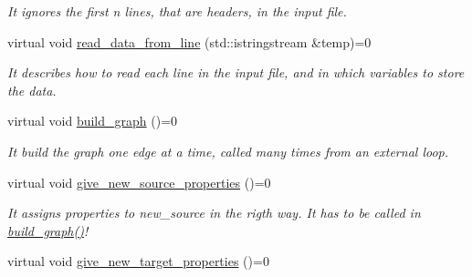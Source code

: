 \begin{DoxyCompactItemize}
\begin{DoxyCompactList}\small\item\em It ignores the first n lines, that are headers, in the input file. \item\end{DoxyCompactList}\item 
\hypertarget{classreader__base__class_a87b9c0f6d6100bab6c8d8ccf0c3a1e7e}{
virtual void \hyperlink{classreader__base__class_a87b9c0f6d6100bab6c8d8ccf0c3a1e7e}{read\_\-data\_\-from\_\-line} (std::istringstream \&temp)=0}
\label{classreader__base__class_a87b9c0f6d6100bab6c8d8ccf0c3a1e7e}

\begin{DoxyCompactList}\small\item\em It describes how to read each line in the input file, and in which variables to store the data. \item\end{DoxyCompactList}\item 
\hypertarget{classreader__base__class_a536131b6cc6f007b87735626c29650c6}{
virtual void \hyperlink{classreader__base__class_a536131b6cc6f007b87735626c29650c6}{build\_\-graph} ()=0}
\label{classreader__base__class_a536131b6cc6f007b87735626c29650c6}

\begin{DoxyCompactList}\small\item\em It build the graph one edge at a time, called many times from an external loop. \item\end{DoxyCompactList}\item 
\hypertarget{classreader__base__class_af9dd018f3818e2ec25ab4de7ab1d1275}{
virtual void \hyperlink{classreader__base__class_af9dd018f3818e2ec25ab4de7ab1d1275}{give\_\-new\_\-source\_\-properties} ()=0}
\label{classreader__base__class_af9dd018f3818e2ec25ab4de7ab1d1275}

\begin{DoxyCompactList}\small\item\em It assigns properties to new\_\-source in the rigth way. It has to be called in \hyperlink{classreader__base__class_a536131b6cc6f007b87735626c29650c6}{build\_\-graph()}! \item\end{DoxyCompactList}\item 
\hypertarget{classreader__base__class_ab98ff4a8a406effb25f0bc4ce89ae3df}{
virtual void \hyperlink{classreader__base__class_ab98ff4a8a406effb25f0bc4ce89ae3df}{give\_\-new\_\-target\_\-properties} ()=0}
\label{classreader__base__class_ab98ff4a8a406effb25f0bc4ce89ae3df}


\end{DoxyCompactItemize}
